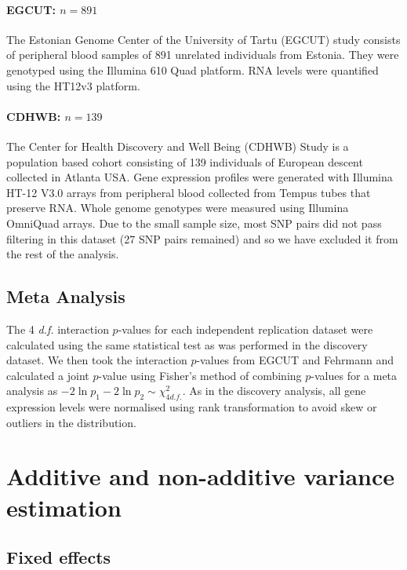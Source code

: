 \documentclass{article}
\begin{document}
\paragraph{EGCUT: $n=891$}
The Estonian Genome Center of the University of Tartu (EGCUT) study \cite{Metspalu2004} consists of peripheral blood samples of 891 unrelated individuals from Estonia. They were genotyped using the Illumina 610 Quad platform. RNA levels were quantified using the HT12v3 platform.

\paragraph{CDHWB: $n=139$}
The Center for Health Discovery and Well Being (CDHWB) Study \cite{Preininger2013} is a population based cohort consisting of 139 individuals of European descent collected in Atlanta USA. Gene expression profiles were generated with Illumina HT-12 V3.0 arrays from peripheral blood collected from Tempus tubes that preserve RNA. Whole genome genotypes were measured using Illumina OmniQuad arrays. Due to the small sample size, most SNP pairs did not pass filtering in this dataset (27 SNP pairs remained) and so we have excluded it from the rest of the analysis.

\subsection{Meta Analysis}

The 4 \emph{d.f.} interaction $p$-values for each independent replication dataset were calculated using the same statistical test as was performed in the discovery dataset. We then took the interaction $p$-values from EGCUT and Fehrmann and calculated a joint $p$-value using Fisher's method of combining $p$-values for a meta analysis as $-2 \ln p_{1} - 2 \ln p_{2} \sim \chi^{2}_{4 d.f.}$. As in the discovery analysis, all gene expression levels were normalised using rank transformation to avoid skew or outliers in the distribution.



\section{Additive and non-additive variance estimation}

\subsection{Fixed effects}
\end{document}
